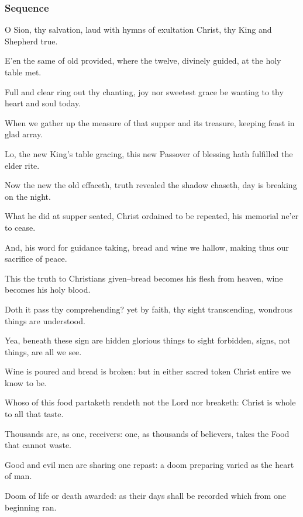 \subsubsection{Sequence}
 O Sion, thy salvation, laud with hymns of exultation Christ, thy King and Shepherd true.\par
{}
E'en the same of old provided, where the twelve, divinely guided, at the holy table met.\par
Full and clear ring out thy chanting, joy nor sweetest grace be wanting to thy heart and soul today.\par
When we gather up the measure of that supper and its treasure, keeping feast in glad array.\par
Lo, the new King's table gracing, this new Passover of blessing hath fulfilled the elder rite.\par
Now the new the old effaceth, truth revealed the shadow chaseth, day is breaking on the night.\par
What he did at supper seated, Christ ordained to be repeated, his memorial ne'er to cease.\par
And, his word for guidance taking, bread and wine we hallow, making thus our sacrifice of peace.\par
This the truth to Christians given--bread becomes his flesh from heaven, wine becomes his holy blood.\par
Doth it pass thy comprehending? yet by faith, thy sight transcending, wondrous things are understood.\par
Yea, beneath these sign are hidden glorious things to sight forbidden, signs, not things, are all we see.\par
Wine is poured and bread is broken: but in either sacred token Christ entire we know to be.\par
Whoso of this food partaketh rendeth not the Lord nor breaketh: Christ is whole to all that taste.\par
Thousands are, as one, receivers: one, as thousands of believers, takes the Food that cannot waste.\par
Good and evil men are sharing one repast: a doom preparing varied as the heart of man.\par
Doom of life or death awarded: as their days shall be recorded which from one beginning ran.\par
